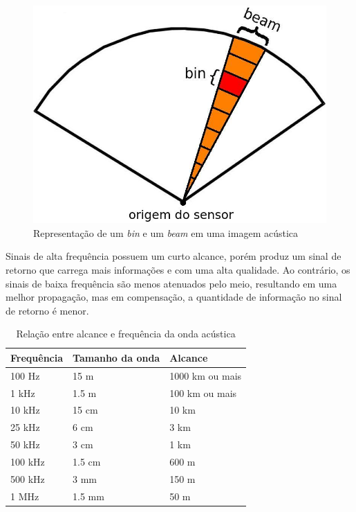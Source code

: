 \begin{figure}[H]
    \centering
    \caption{Representação de um \textit{bin} e um \textit{beam} em uma imagem acústica}
    \label{fig:imagem_acustica}
    \includegraphics[scale=0.3]{dados/figuras/imagem_acustica.jpg}
\end{figure}

Sinais de alta frequência possuem um curto alcance, porém produz um sinal de retorno que carrega mais informações e com uma alta qualidade. Ao contrário, os sinais de baixa frequência são menos atenuados pelo meio, resultando em uma melhor propagação, mas em compensação, a quantidade de informação no sinal de retorno é menor.

\begin{table}[H]
    \centering
    \caption{Relação entre alcance e frequência da onda acústica}
    \label{tab:freq-acustica}
    \begin{tabular}{@{}lll@{}}
    \toprule
        Frequência & Tamanho da onda & Alcance \\ \midrule
        100 Hz & 15 m & 1000 km ou mais \\
        1 kHz & 1.5 m & 100 km ou mais \\
        10 kHz & 15 cm & 10 km \\
        25 kHz & 6 cm & 3 km \\
        50 kHz & 3 cm & 1 km \\
        100 kHz & 1.5 cm & 600 m \\
        500 kHz & 3 mm & 150 m \\
        1 MHz & 1.5 mm & 50 m \\ \bottomrule
    \end{tabular}
\end{table}

